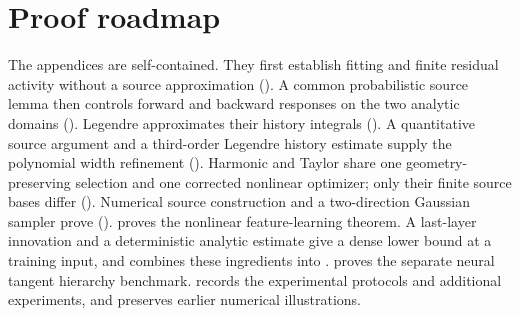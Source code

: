 \section{Proof roadmap}
\label{cp:roadmap}

The appendices are self-contained. They first establish fitting and finite
residual activity without a source approximation
(). A common probabilistic source lemma then
controls forward and backward responses on the two analytic domains
(). Legendre approximates their history integrals
(). A quantitative source argument and a
third-order Legendre history estimate supply the polynomial width refinement
(). Harmonic and Taylor share one
geometry-preserving selection and one corrected nonlinear optimizer; only
their finite source bases differ (). Numerical
source construction and a two-direction Gaussian sampler prove
 ().
 proves the nonlinear feature-learning
theorem. A last-layer innovation and a deterministic analytic estimate give
a dense lower bound at a training input, and  combines
these ingredients into .  proves the
separate neural tangent hierarchy benchmark. 
records the experimental protocols and additional experiments, and
 preserves earlier numerical illustrations.









